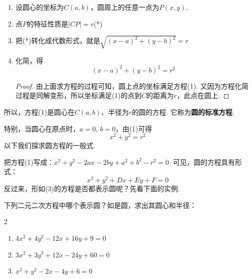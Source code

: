 \begin{enumerate}
    \item 设圆心的坐标为$C(a,b)$，圆周上的任意一点为$P(x,y)$.
    \item 点$P$的特征性质是$|CP|=r$\hfill  (*)
    \item 把(*)转化成代数形式，就是$\sqrt{(x-a)^2+(y-b)^2}=r$
\item 化简，得
\begin{equation}
     (x-a)^2+(y-b)^2=r^2 \tag{1}
\end{equation}

\begin{proof}
    由上面求方程的过程可知，圆上点的坐标满足方程(1). 又因为方程化简过程是同解变形，所以坐标满足(1)的点到$C$的距离为$r$，此点在圆上.
\end{proof}
\end{enumerate}

    所以，方程(1)是圆心在$C(a,b)$、半径为$r$的圆的方程. 它称为\textbf{圆的标准方程}.
    
    特别，当圆心在原点时，$a=0$, $b=0$，由(1)可得
\begin{equation}
     x^2+y^2=r^2 \tag{2}
\end{equation}   
    以下我们探求圆方程的一般式.

    把方程(1)写成：$x^2+y^2-2ax-2by+a^2+b^2-r^2=0$. 可见，圆的方程具有形式：
    \begin{equation}
       x^2+y^2+Dx+Ey+F=0    \tag{3}
    \end{equation}
反过来，形如(3)的方程是否都表示圆呢？先看下面的实例.

\begin{example}
下列二元二次方程中哪个表示圆？如是圆，求出其圆心和半径：
\begin{multicols}{2}
\begin{enumerate}[(1)]
    \item $4x^2+4y^2-12x+16y+9=0$
    \item $3x^2+3y^2+12x-24y+60=0$
    \item $x^2+y^2-2x-4y+6=0$
\end{enumerate}    
\end{multicols}
\end{example}

